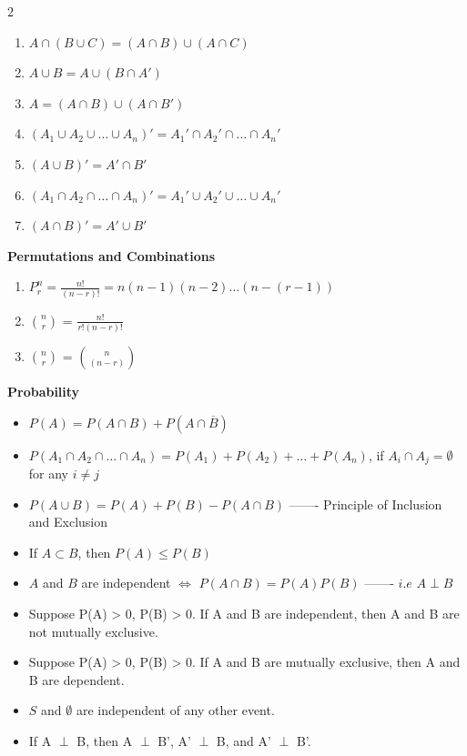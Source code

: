 \documentclass[10pt,landscape]{article}
\begin{document}
\begin{multicols*}{2}
\begin{enumerate}
    \item $A \cap (B \cup C) = (A \cap B) \cup (A \cap C)$
    \item $A \cup B = A \cup (B \cap A')$
    \item $A = (A \cap B) \cup (A \cap B')$
    \item $(A_1 \cup A_2 \cup \dots \cup A_n)' = A_1' \cap A_2' \cap \dots \cap A_n'$
    \item $(A \cup B)' = A' \cap B'$
    \item $(A_1 \cap A_2 \cap \dots \cap A_n)' = A_1' \cup A_2' \cup \dots \cup A_n'$
    \item $(A \cap B)' = A' \cup B'$
\end{enumerate}
\vspace{8pt}
\textbf{Permutations and Combinations} \\
\begin{enumerate}
    \item $P^n_r=\frac{n!}{(n-r)!}=n(n-1)(n-2)\dots (n-(r-1))$ \\
    \item $n \choose {r}$ = $\frac{n!}{r!(n-r)!}$ \\
    \item $n\choose r$ = $n \choose (n-r)$
\end{enumerate}
\vspace{8pt}
\textbf{Probability}
\begin{itemize}
    \item $P(A)=P(A\cap{B})+P(A\cap \overline{B})$  
    \item $P(A_1 \cap A_2 \cap \dots \cap A_n) = P(A_1) + P(A_2) + \dots + P(A_n)$, if $A_i \cap A_j = \emptyset$ for any $i \neq j$
    \item $P(A \cup B) = P(A) + P(B) - P(A \cap B)$ ------- Principle of Inclusion and Exclusion
    \item If $A \subset B$, then $P(A) \leq P(B)$ 
    \item $A$ and $B$ are independent $\iff$ $P(A \cap B) = P(A)P(B)$ ------- $i.e$ $A\perp B$   
    \item Suppose P(A) > 0, P(B) > 0. If A and B are independent, then A and B are not mutually exclusive.
    \item Suppose P(A) > 0, P(B) > 0. If A and B are mutually exclusive, then A and B are dependent. 
    \item $S$ and $\emptyset$ are independent of any other event.
    \item If A $\perp$ B, then A $\perp$ B', A' $\perp$ B, and A' $\perp$ B'.

\end{itemize}
\end{multicols*}
\end{document}
